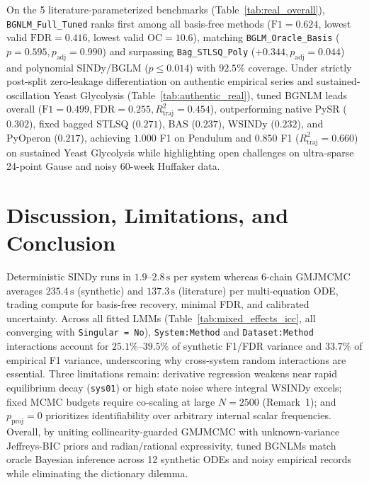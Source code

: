 \documentclass{article}
\begin{document}
On the 5 literature-parameterized benchmarks (Table~\ref{tab:real_overall}), \texttt{BGNLM\_Full\_Tuned} ranks first among all basis-free methods ($\text{F1}=0.624$, lowest valid $\text{FDR}=0.416$, lowest valid $\text{OC}=10.6$), matching \texttt{BGLM\_Oracle\_Basis} ($p=0.595, p_{\text{adj}}=0.990$) and surpassing \texttt{Bag\_STLSQ\_Poly} ($+0.344, p_{\text{adj}}=0.044$) and polynomial SINDy/BGLM ($p \le 0.014$) with $92.5\%$ coverage. Under strictly post-split zero-leakage differentiation on authentic empirical series and sustained-oscillation Yeast Glycolysis (Table~\ref{tab:authentic_real}), tuned BGNLM leads overall ($\text{F1}=0.499, \text{FDR}=0.255, R^2_{\text{traj}}=0.454$), outperforming native PySR ($0.302$), fixed bagged STLSQ ($0.271$), BAS ($0.237$), WSINDy ($0.232$), and PyOperon ($0.217$), achieving $1.000$ F1 on Pendulum and $0.850$ F1 ($R^2_{\text{traj}}=0.660$) on sustained Yeast Glycolysis while highlighting open challenges on ultra-sparse 24-point Gause and noisy 60-week Huffaker data.

\section{Discussion, Limitations, and Conclusion}

Deterministic SINDy runs in $1.9$--$2.8\,\text{s}$ per system whereas 6-chain GMJMCMC averages $235.4\,\text{s}$ (synthetic) and $137.3\,\text{s}$ (literature) per multi-equation ODE, trading compute for basis-free recovery, minimal FDR, and calibrated uncertainty. Across all fitted LMMs (Table~\ref{tab:mixed_effects_icc}, all converging with \texttt{Singular = No}), \texttt{System:Method} and \texttt{Dataset:Method} interactions account for $25.1\%$--$39.5\%$ of synthetic F1/FDR variance and $33.7\%$ of empirical F1 variance, underscoring why cross-system random interactions are essential. Three limitations remain: derivative regression weakens near rapid equilibrium decay (\texttt{sys01}) or high state noise where integral WSINDy excels; fixed MCMC budgets require co-scaling at large $N=2500$ (Remark~1); and $p_{\text{proj}}=0$ prioritizes identifiability over arbitrary internal scalar frequencies. Overall, by uniting collinearity-guarded GMJMCMC with unknown-variance Jeffreys-BIC priors and radian/rational expressivity, tuned BGNLMs match oracle Bayesian inference across 12 synthetic ODEs and noisy empirical records while eliminating the dictionary dilemma.
\end{document}
